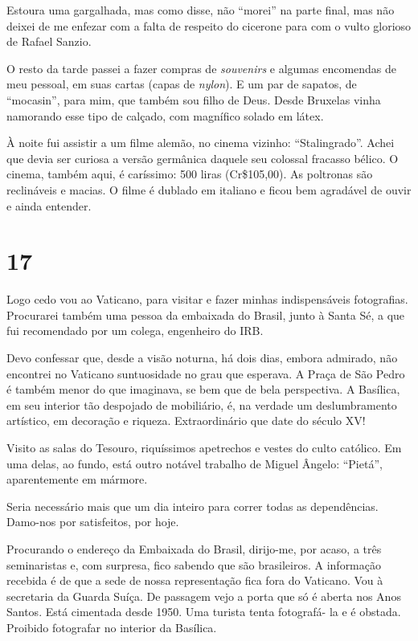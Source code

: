 Estoura uma gargalhada, mas como disse, não ``morei'' na parte final, mas não deixei de me enfezar com a falta de respeito do cicerone para com o vulto glorioso de Rafael Sanzio.

O resto da tarde passei a fazer compras de \textit{souvenirs} e algumas encomendas de meu pessoal, em suas cartas (capas de \textit{nylon}). E um par de sapatos, de ``mocasin'', para mim, que também sou filho de Deus. Desde Bruxelas vinha namorando esse tipo de calçado, com magnífico solado em látex.

À noite fui assistir a um filme alemão, no cinema vizinho: ``Stalingrado''. Achei que devia ser curiosa a versão germânica daquele seu colossal fracasso bélico. O cinema, também aqui, é caríssimo: 500 liras (Cr\$105,00). As poltronas são reclináveis e macias. O filme é dublado em italiano e ficou bem agradável de ouvir e ainda entender.

\section*{17 \adfflatleafright {}}
Logo cedo vou ao Vaticano, para visitar e fazer minhas indispensáveis fotografias. Procurarei também uma pessoa da embaixada do Brasil, junto à Santa Sé, a que fui recomendado por um colega, engenheiro do IRB.

Devo confessar que, desde a visão noturna, há dois dias, embora admirado, não encontrei no Vaticano suntuosidade no grau que esperava. A Praça de São Pedro é também menor do que imaginava, se bem que de bela perspectiva. A Basílica, em seu interior tão despojado de mobiliário, é, na verdade um deslumbramento artístico, em decoração e riqueza. Extraordinário que date do século XV!

Visito as salas do Tesouro, riquíssimos apetrechos e vestes do culto católico. Em uma delas, ao fundo, está outro notável trabalho de Miguel Ângelo: ``Pietá'', aparentemente em mármore.

Seria necessário mais que um dia inteiro para correr todas as dependências. Damo-nos por satisfeitos, por hoje.

Procurando o endereço da Embaixada do Brasil, dirijo-me, por acaso, a três seminaristas e, com surpresa, fico sabendo que são brasileiros. A informação recebida é de que a sede de nossa representação fica fora do Vaticano. Vou à secretaria da Guarda Suíça. De passagem vejo a porta que só é aberta nos Anos Santos. Está cimentada desde 1950. Uma turista tenta fotografá- la e é obstada. Proibido fotografar no interior da Basílica.

